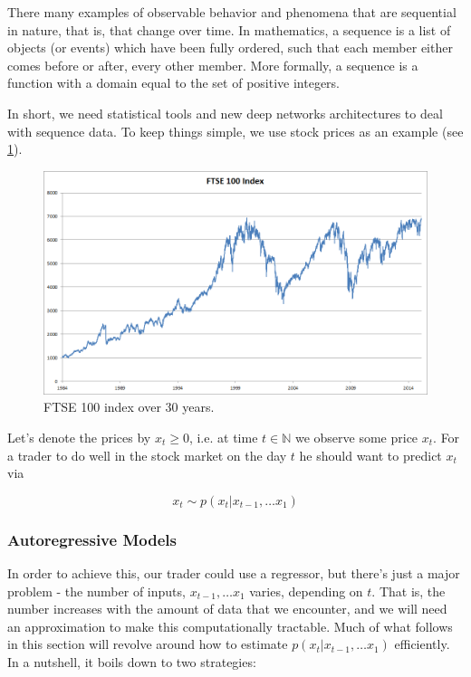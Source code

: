 There many examples of observable behavior and phenomena that are sequential in nature, that is, that change over time. In mathematics, a sequence is a list of objects (or events) which have been fully ordered, such that each member either comes before or after, every other member. More formally, a sequence is a function with a domain equal to the set of positive integers.

In short, we need statistical tools and new deep networks architectures to deal with sequence data. To keep things simple, we use stock prices as an example (see \cref{fig:ftse100}).

\begin{figure}[hpt]
    \centering
    \includegraphics[scale=0.5]{images/app/ftse100.png}
    \caption{FTSE 100 index over 30 years.}
    \label{fig:ftse100}
\end{figure}

Let’s denote the prices by $x_t \geq 0$, i.e. at time $t \in \mathbb{N}$ we observe some price $x_t$. For a trader to do well in the stock market on the day $t$ he should want to predict $x_t$ via

$$x_t \sim p(x_t|x_{t-1}, \ldots x_1)$$

\subsubsection{Autoregressive Models}

In order to achieve this, our trader could use a regressor, but there’s just a major problem - the number of inputs, $x_{t-1}, \ldots x_1$ varies, depending on $t$. That is, the number increases with the amount of data that we encounter, and we will need an approximation to make this computationally tractable. Much of what follows in this section will revolve around how to estimate $p(x_t|x_{t-1}, \ldots x_1)$ efficiently. In a nutshell, it boils down to two strategies:

